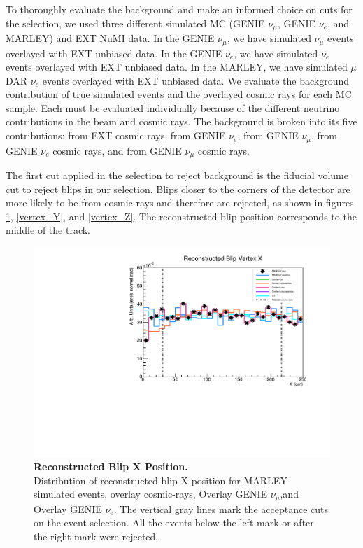 To thoroughly evaluate the background and make an informed choice on cuts for the selection, we used three different simulated MC (GENIE $\nu_{\mu}$, GENIE $\nu_{e}$, and MARLEY) and EXT NuMI data. In the GENIE $\nu_{\mu}$, we have simulated $\nu_{\mu}$ events overlayed with EXT unbiased data. In the GENIE $\nu_{e}$, we have simulated $\nu_{e}$ events overlayed with EXT unbiased data. In the MARLEY, we have simulated $\mu$DAR $\nu_e$ events overlayed with EXT unbiased data. We evaluate the background contribution of true simulated events and the overlayed cosmic rays for each MC sample. Each must be evaluated individually because of the different neutrino contributions in the beam and cosmic rays. The background is broken into its five contributions: from EXT cosmic rays, from GENIE $\nu_{e}$, from GENIE $\nu_{\mu}$, from GENIE $\nu_{e}$ cosmic rays, and from GENIE $\nu_{\mu}$ cosmic rays. 

The first cut applied in the selection to reject background is the fiducial volume cut to reject blips in our selection. Blips closer to the corners of the detector are more likely to be from cosmic rays and therefore are rejected, as shown in figures \ref{vertex_X}, \ref{vertex_Y}, and \ref{vertex_Z}. The reconstructed blip position corresponds to the middle of the track. 

\begin{figure}[h!]
    \centering
    \includegraphics[width=120mm]{Figures/vertex_X.pdf}
    \caption[Reconstructed Blip X Position.]{{\textbf{Reconstructed Blip X Position.}}\\ Distribution of reconstructed blip X position for MARLEY simulated events, overlay cosmic-rays, Overlay GENIE $\nu_{\mu}$,and Overlay GENIE $\nu_{e}$. The vertical gray lines mark the acceptance cuts on the event selection. All the events below the left mark or after the right mark were rejected.}
    \label{vertex_X}
\end{figure}

